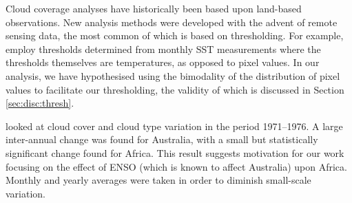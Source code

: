 Cloud coverage analyses have historically been based upon land-based
observations. New analysis methods were developed with the advent of remote
sensing data, the most common of which is based on thresholding. For example,
\cite{derrien1993} employ thresholds determined from monthly SST measurements
where the thresholds themselves are temperatures, as opposed to pixel values. In
our analysis, we have hypothesised using the bimodality of the distribution of pixel
values to facilitate our thresholding, the validity of which is discussed in
Section \ref{sec:disc:thresh}.

\cite{warren2007} looked at cloud cover and cloud type variation in the period
1971--1976. A large inter-annual change was found for Australia, with a small but
statistically significant change found for Africa. This result suggests
motivation for our work focusing on the effect of ENSO (which is known to affect
Australia) upon Africa. Monthly and yearly averages were taken in order to
diminish small-scale variation.

